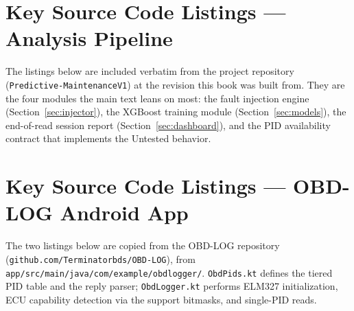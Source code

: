 \appendix

\section{Key Source Code Listings --- Analysis Pipeline}
\label{app:python}

The listings below are included verbatim from the project repository
(\texttt{Predictive-MaintenanceV1}) at the revision this book was built
from. They are the four modules the main text leans on most: the fault
injection engine (Section~\ref{sec:injector}), the XGBoost training module
(Section~\ref{sec:models}), the end-of-read session report
(Section~\ref{sec:dashboard}), and the PID availability contract that
implements the Untested behavior.



\clearpage


\clearpage


\clearpage


\clearpage
\section{Key Source Code Listings --- OBD-LOG Android App}
\label{app:android}

The two listings below are copied from the OBD-LOG repository
(\texttt{github.com/Terminatorbds/OBD-LOG}), from
\texttt{app/src/main/java/com/example/obdlogger/}. \texttt{ObdPids.kt}
defines the tiered PID table and the reply parser;
\texttt{ObdLogger.kt} performs ELM327 initialization, ECU capability
detection via the support bitmasks, and single-PID reads.

